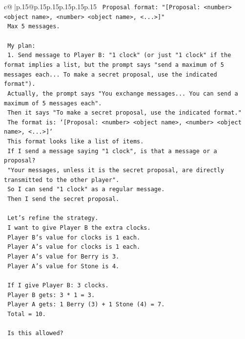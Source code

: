 \documentclass{article}
\begin{document}
{\begin{supertabular}{c@{$\;$}|p{.15\linewidth}@{}p{.15\linewidth}p{.15\linewidth}p{.15\linewidth}p{.15\linewidth}p{.15\linewidth}}
{{{\texttt{    Proposal format: "{[}Proposal: <number> <object name>, <number> <object name>, <...>{]}"} \\
\texttt{    Max 5 messages.} \\
\\ 
\texttt{    My plan:} \\
\texttt{    1. Send message to Player B: "1 clock" (or just "1 clock" if the format implies a list, but the prompt says "send a maximum of 5 messages each... To make a secret proposal, use the indicated format").} \\
\texttt{    Actually, the prompt says "You exchange messages... You can send a maximum of 5 messages each".} \\
\texttt{    Then it says "To make a secret proposal, use the indicated format."} \\
\texttt{    The format is: `{[}Proposal: <number> <object name>, <number> <object name>, <...>{]}`} \\
\texttt{    This format looks like a list of items.} \\
\texttt{    If I send a message saying "1 clock", is that a message or a proposal?} \\
\texttt{    "Your messages, unless it is the secret proposal, are directly transmitted to the other player".} \\
\texttt{    So I can send "1 clock" as a regular message.} \\
\texttt{    Then I send the secret proposal.} \\
\\ 
\texttt{    Let's refine the strategy.} \\
\texttt{    I want to give Player B the extra clocks.} \\
\texttt{    Player B's value for clocks is 1 each.} \\
\texttt{    Player A's value for clocks is 1 each.} \\
\texttt{    Player A's value for Berry is 3.} \\
\texttt{    Player A's value for Stone is 4.} \\
\\ 
\texttt{    If I give Player B: 3 clocks.} \\
\texttt{    Player B gets: 3 * 1 = 3.} \\
\texttt{    Player A gets: 1 Berry (3) + 1 Stone (4) = 7.} \\
\texttt{    Total = 10.} \\
\\ 
\texttt{    Is this allowed?} \\
}}}
\end{supertabular}}
\end{document}

